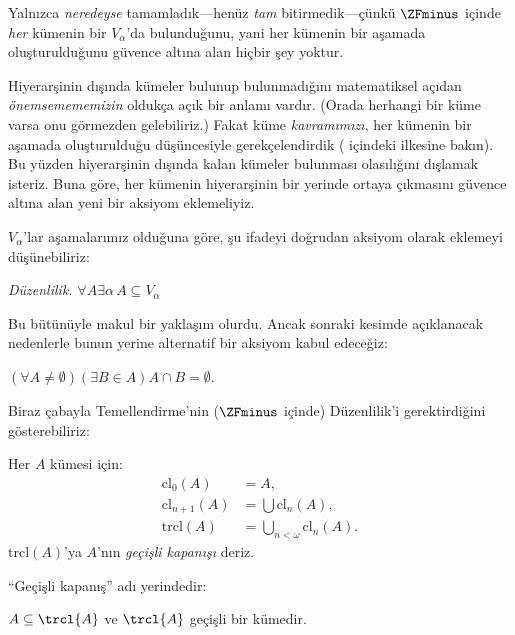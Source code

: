 



Yalnızca \emph{neredeyse} tamamladık---henüz \emph{tam} bitirmedik---çünkü
$\ZFminus$ içinde \emph{her} kümenin bir $V_\alpha$'da bulunduğunu, yani
her kümenin bir aşamada oluşturulduğunu güvence altına alan hiçbir şey
yoktur.

Hiyerarşinin dışında kümeler bulunup bulunmadığını matematiksel açıdan
\emph{önemsemememizin} oldukça açık bir anlamı vardır. (Orada herhangi bir
küme varsa onu görmezden gelebiliriz.) Fakat küme \emph{kavramımızı}, her
kümenin bir aşamada oluşturulduğu düşüncesiyle gerekçelendirdik
( içindeki \stageshier{} ilkesine bakın). Bu yüzden
hiyerarşinin dışında kalan kümeler bulunması olasılığını dışlamak isteriz.
Buna göre, her kümenin hiyerarşinin bir yerinde ortaya çıkmasını güvence
altına alan yeni bir aksiyom eklemeliyiz.

$V_\alpha$'lar aşamalarımız olduğuna göre, şu ifadeyi doğrudan aksiyom
olarak eklemeyi düşünebiliriz:

\begin{defish}
\emph{Düzenlilik.} $\forall A \exists \alpha\, A \subseteq V_\alpha$
\end{defish}

Bu bütünüyle makul bir yaklaşım olurdu. Ancak sonraki kesimde açıklanacak
nedenlerle bunun yerine alternatif bir aksiyom kabul edeceğiz:

\begin{axiom}[Temellendirme]
$(\forall A \neq \emptyset)(\exists B \in A)A \cap B = \emptyset$.
\end{axiom}

Biraz çabayla Temellendirme'nin ($\ZFminus$ içinde) Düzenlilik'i
gerektirdiğini gösterebiliriz:
\begin{defn}
Her $A$ kümesi için:
\begin{align*}
	\text{cl}_0(A) &= A,\\
	\text{cl}_{n+1}(A) &= \bigcup \text{cl}_n(A),\\
	\text{trcl}(A) &= \bigcup_{n < \omega} \text{cl}_{n}(A).
\end{align*}
$\text{trcl}(A)$'ya $A$'nın \emph{geçişli kapanışı} deriz.
\end{defn}
\noindent
``Geçişli kapanış'' adı yerindedir:
\begin{prop}
$A \subseteq \trcl{A}$ ve $\trcl{A}$ geçişli bir kümedir.
\end{prop}

